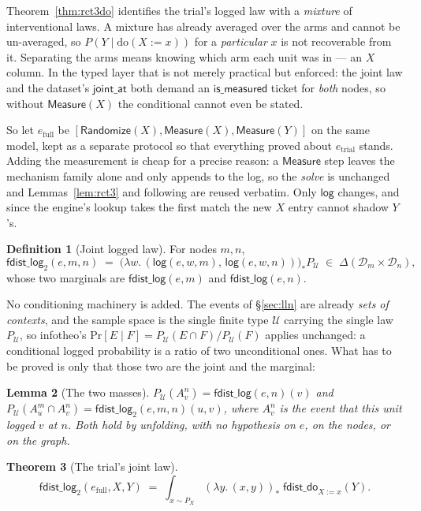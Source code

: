 \documentclass[11pt,a4paper]{article}
\theoremstyle{definition}
\newtheorem{definition}{Definition}[section]
\theoremstyle{plain}
\newtheorem{theorem}[definition]{Theorem}
\newtheorem{lemma}[definition]{Lemma}
\theoremstyle{remark}
\newcommand{\dom}{\mathcal{D}}
\newcommand{\Ctx}{\mathcal{U}}         %
\newcommand{\fdo}{\mathsf{fdist\_do}}
\newcommand{\Dist}[1]{\Delta(#1)}      %
\newcommand{\push}[1]{{#1}_{*}}        %
\newcommand{\logv}{\mathsf{log}}
\renewcommand{\Pr}{\mathrm{Pr}}
\begin{document}
Theorem~\ref{thm:rct3do} identifies the trial's logged law with a
\emph{mixture} of interventional laws. A mixture has already averaged over
the arms and cannot be un-averaged, so $P(Y \mid \mathrm{do}(X := x))$ for a
\emph{particular} $x$ is not recoverable from it. Separating the arms means
knowing which arm each unit was in --- an $X$ column. In the typed layer
that is not merely practical but enforced: the joint law and the dataset's
$\mathsf{joint\_at}$ both demand an $\mathsf{is\_measured}$ ticket for
\emph{both} nodes, so without $\mathsf{Measure}(X)$ the conditional cannot
even be stated.

So let $e_{\mathrm{full}}$ be
$[\mathsf{Randomize}(X), \mathsf{Measure}(X), \mathsf{Measure}(Y)]$ on the
same model, kept as a separate protocol so that everything proved about
$e_{\mathrm{trial}}$ stands. Adding the measurement is cheap for a precise
reason: a $\mathsf{Measure}$ step leaves the mechanism family alone and only
appends to the log, so the \emph{solve} is unchanged and
Lemmas~\ref{lem:rct3} and following are reused verbatim. Only $\logv$
changes, and since the engine's lookup takes the first match the new $X$
entry cannot shadow $Y$'s.

\begin{definition}[Joint logged law]
For nodes $m,n$,
\[
  \mathsf{fdist\_log}_2(e,m,n)
  \;=\;
  \push{\bigl(\lambda w.\,(\logv(e,w,m),\,\logv(e,w,n))\bigr)} P_\Ctx
  \;\in\; \Dist{\dom_m \times \dom_n},
\]
whose two marginals are $\mathsf{fdist\_log}(e,m)$ and
$\mathsf{fdist\_log}(e,n)$.
\end{definition}

No conditioning machinery is added. The events of \S\ref{sec:lln} are
already \emph{sets of contexts}, and the sample space is the single
finite type $\Ctx$ carrying the single law $P_\Ctx$, so infotheo's
$\Pr[E \mid F] = P_\Ctx(E \cap F) / P_\Ctx(F)$ applies unchanged: a
conditional logged probability is a ratio of two unconditional ones. What
has to be proved is only that those two are the joint and the marginal:

\begin{lemma}[The two masses]
\label{lem:prout}
$P_\Ctx(A_v^{n}) = \mathsf{fdist\_log}(e,n)(v)$ and
$P_\Ctx(A_u^{m} \cap A_v^{n}) = \mathsf{fdist\_log}_2(e,m,n)(u,v)$,
where $A_v^{n}$ is the event that this unit logged $v$ at $n$. Both hold by
unfolding, with no hypothesis on $e$, on the nodes, or on the graph.
\end{lemma}

\begin{theorem}[The trial's joint law]
\label{thm:rct3joint}
\[
  \mathsf{fdist\_log}_2(e_{\mathrm{full}}, X, Y)
  \;=\;
  \int_{x \sim P_X} \push{(\lambda y.\,(x,y))}\;\fdo_{X := x}(Y) .
\]
\end{theorem}
\end{document}

